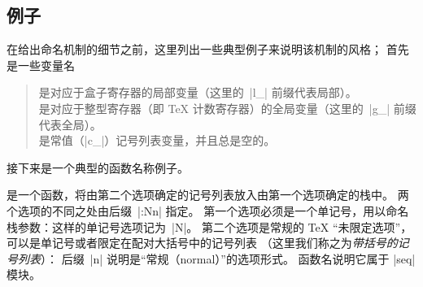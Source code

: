 \documentclass[full]{l3doc}
\begin{document}
\subsection{例子}
%
在给出命名机制的细节之前，这里列出一些典型例子来说明该机制的风格；
首先是一些变量名
\begin{quote}
     是对应于盒子寄存器的局部变量（这里的~|l_| 前缀代表局部）。\\
     是对应于整型寄存器（即 \TeX{} 计数寄存器）的全局变量（这里的~|g_| 前缀代表全局）。\\
     是常值（|c_|）记号列表变量，并且总是空的。
\end{quote}
%
接下来是一个典型的函数名称例子。

%
%
 是一个函数，将由第二个选项确定的记号列表放入由第一个选项确定的栈中。
两个选项的不同之处由后缀~|:Nn| 指定。
第一个选项必须是一个单记号，用以命名栈参数：这样的单记号选项记为~|N|。
第二个选项是常规的 \TeX{} “未限定选项”，可以是单记号或者限定在配对大括号中的记号列表
（这里我们称之为\emph{带括号的记号列表}）：
后缀~|n| 说明是“常规（normal）”的选项形式。
函数名说明它属于 |seq| 模块。
\end{document}
